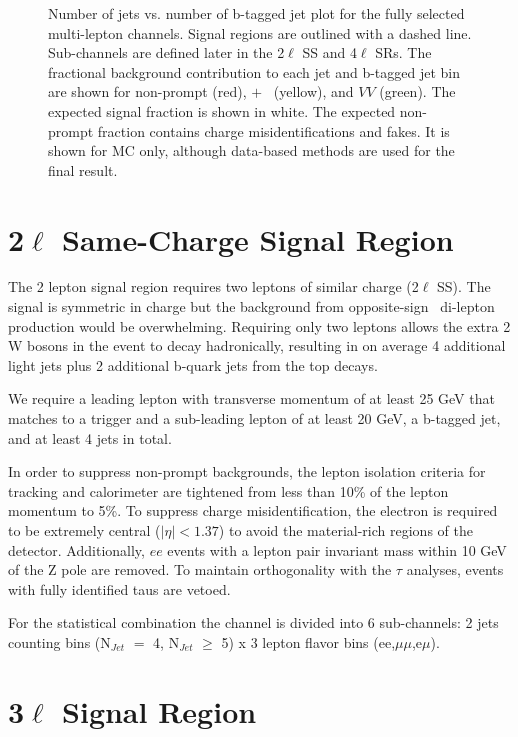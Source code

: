 \begin{figure}[!t]
\begin{tabular}{ccc}
\end{tabular} 
\caption{Number of jets vs. number of b-tagged jet plot for the fully selected multi-lepton channels. Signal regions
are outlined with a dashed line. Sub-channels are defined later in the 2$\ell$ SS and 4$\ell$ SRs. The fractional
background contribution to each jet and b-tagged jet bin are shown for non-prompt (red), \ttV $+$ \tZ\ (yellow), and $VV$ (green). The expected signal 
fraction is shown in white. The expected non-prompt fraction contains charge misidentifications and fakes. It is shown for MC only, although
data-based methods are used for the final result.
}
\label{figure:selection}
\end{figure}

\section{2$\ell$ Same-Charge Signal Region}

The 2 lepton signal region requires two leptons of similar charge (2$\ell$ SS). The signal is symmetric in charge but
the background from opposite-sign \ttbar\ di-lepton production would be overwhelming. Requiring
only two leptons allows the extra 2 W bosons in the event to decay hadronically, resulting in on average 4 additional
light jets plus 2 additional b-quark jets from the top decays. 

We require a leading lepton with transverse momentum of at least 25 GeV that matches to a
trigger and a sub-leading lepton of at least 20 GeV, a b-tagged jet, and at least 4 jets in
total.  

In order to suppress non-prompt backgrounds, the lepton isolation criteria for tracking and 
calorimeter are tightened from less than 10\% of the lepton momentum to 5\%. To suppress
charge misidentification, the electron is required to be extremely central ($|\eta| < 1.37$) 
to avoid the material-rich regions of the detector. Additionally, $ee$ events with a 
lepton pair invariant mass within 10 GeV of the Z pole are removed. To maintain orthogonality with the $\tau$ analyses, events with fully identified
taus are vetoed.

For the statistical combination the channel is divided into 6 sub-channels:
2 jets counting bins (N$_{Jet}$ $=$ 4, N$_{Jet}$ $\geq$ 5) x 3 lepton flavor bins (ee,$\mu\mu$,e$\mu$). 


\section{3$\ell$ Signal Region}

